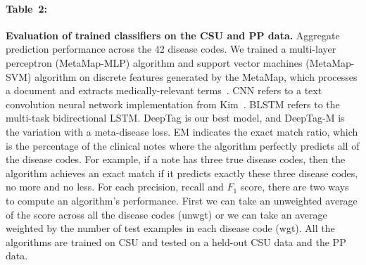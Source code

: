 \documentclass{article}[11pt,oneside]
\begin{document}
\paragraph{Table~2:} \textbf{Evaluation of trained classifiers on the CSU and PP data.} Aggregate prediction performance across the 42 disease codes. 
We trained a multi-layer perceptron (MetaMap-MLP) algorithm and support vector machines (MetaMap-SVM) algorithm on discrete features generated by the MetaMap, which processes a document and extracts medically-relevant terms~\cite{aronson2010overview}.
CNN refers to a text convolution neural network implementation from Kim~\cite{kim2014convolutional}. BLSTM refers to the multi-task bidirectional LSTM. DeepTag is our best model, and DeepTag-M is the variation with a meta-disease loss. EM indicates the exact match ratio, which is the percentage of the clinical notes where the algorithm perfectly predicts all of the disease codes. For example, if a note has three true disease codes, then the algorithm achieves an exact match if it predicts exactly these three disease codes, no more and no less. For each precision, recall and $F_1$ score, there are two ways to compute an algorithm's performance. First we can take an unweighted average of the score across all the disease codes (unwgt) or we can take an average weighted by the number of test examples in each disease code (wgt). All the algorithms are trained on CSU and tested on a held-out CSU data and the PP data. 





\end{document}
